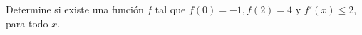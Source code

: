 \item Determine si existe una función $f$ tal que $f(0) = -1, f(2) = 4$ y $f'(x) \le 2$, para todo $x$.
